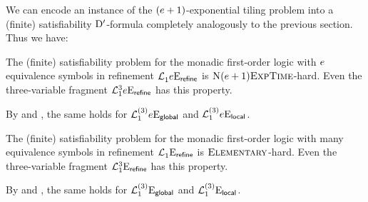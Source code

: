 We can encode an instance of the $(e+1)$-exponential tiling problem into a
(finite) satisfiability ${\mathrm{D'}}$-formula completely analogously to the previous
section. Thus we have:
\begin{proposition}
The (finite) satisfiability problem for the monadic first-order logic with
$e$ equivalence symbols in refinement $\mathcal{L}^{{}}_{1}{e}\mathrm{E}_{\mathsf{refine}}$ is
$\text{\normalfont{\scshape N}}(e+1)\text{\normalfont{\scshape ExpTime}}$-hard. Even the three-variable fragment
$\mathcal{L}^{3}_{1}{e}\mathrm{E}_{\mathsf{refine}}$ has this property.

By  and , the same
holds for $\mathcal{L}^{(3)}_{1}{e}\mathrm{E}_{\mathsf{global}}$ and
$\mathcal{L}^{(3)}_{1}{e}\mathrm{E}_{\mathsf{local}}$.
\end{proposition}
\begin{proposition}
The (finite) satisfiability problem for the monadic first-order logic with many
equivalence symbols in refinement $\mathcal{L}^{{}}_{1}{{}}\mathrm{E}_{\mathsf{refine}}$ is
$\text{\normalfont{\scshape Elementary}}$-hard. Even the three-variable fragment
$\mathcal{L}^{3}_{1}{{}}\mathrm{E}_{\mathsf{refine}}$ has this property.

By  and , the same 
holds for $\mathcal{L}^{(3)}_{1}{{}}\mathrm{E}_{\mathsf{global}}$ and
$\mathcal{L}^{(3)}_{1}{{}}\mathrm{E}_{\mathsf{local}}$.
\end{proposition}